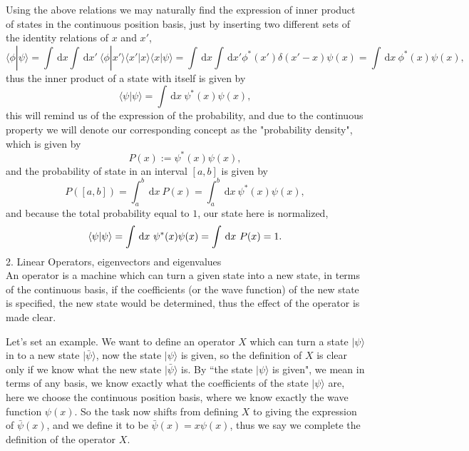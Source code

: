 \documentclass{article}
\newcommand{\be}{\begin{equation}}
\newcommand{\ee}{\end{equation}}
\newcommand{\dif}{\,\mathrm{d}}
\newcommand{\1}{\left}
\newcommand{\2}{\right}
\newcommand{\la}{\langle}
\newcommand{\ra}{\rangle}
\newcommand{\del}{\delta}
\begin{document}
Using the above relations we may naturally find the expression of inner product of states in the continuous position basis, just by inserting two different sets of the identity relations of $x$ and $x'$,
\be
\la \phi|\psi\ra = \int \dif x \int \dif x' \ \la \phi|x'\ra\la x'|x\ra\la x|\psi\ra=\int \dif x \int \dif x' \phi^*(x') \del(x'-x) \psi(x)=\int \dif x \ \phi^*(x)\psi(x),
\ee
thus the inner product of a state with itself is given by
\be
\la \psi|\psi\ra =\int \dif x \ \psi^*(x)\psi(x),
\ee
this will remind us of the expression of the probability, and due to the continuous property we will denote our corresponding concept as the "probability density", which is given by
\be
P(x):=\psi^*(x)\psi(x),
\ee
and the probability of state in an interval $[a,b]$ is given by
\be
P([a,b])=\int_a^b \dif x\ P(x)=\int_a^b \dif x\ \psi^*(x)\psi(x),
\ee
and because the total probability equal to $1$, our state here is normalized,
\be
\la \psi|\psi\ra =\int \dif x \ \psi^*(x)\psi(x)=\int  \dif x\ P(x)=1.\\
\ee
2. Linear Operators, eigenvectors and eigenvalues\\

An operator is a machine which can turn a given state into a new state, in terms of the continuous basis, if the coefficients (or the wave function) of the new state is specified, the new state would be determined, thus the effect of the operator is made clear.

Let's set an example. We want to define an operator $X$ which can turn a state $|\psi\ra$ in to a new state $|\bar\psi\ra$, now the state $|\psi\ra$ is given, so the definition of $X$ is clear only if we know what the new state $|\bar\psi\ra$ is. By ``the state $|\psi\ra$ is given", we mean in terms of any basis, we know exactly what the coefficients of the state $|\psi\ra$ are, here we choose the continuous position basis, where we know exactly the wave function $\psi(x)$. So the task now shifts from defining $X$ to giving the expression of $\bar\psi(x)$, and we define it to be $\bar\psi(x)=x\psi(x)$, thus we say we complete the definition of the operator $X$.
\end{document}
